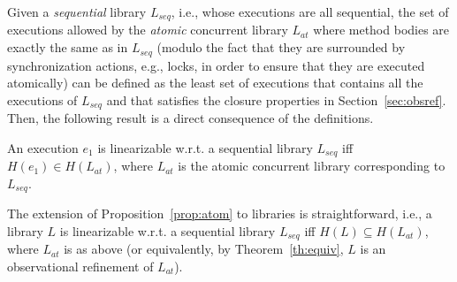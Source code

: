 Given a \emph{sequential} library $L_{seq}$, i.e., whose executions are all sequential, the set of executions allowed by the \emph{atomic} concurrent library $L_{at}$ where method bodies are exactly the same as in $L_{seq}$ (modulo the fact that they are surrounded by synchronization actions, e.g., locks, in order to ensure that they are executed atomically) can be defined as the least set of executions that contains all the executions of $L_{seq}$ and that satisfies the closure properties in Section~\ref{sec:obsref}. Then, the following result is a direct consequence of the definitions.

\begin{proposition}\label{prop:atom}
An execution $e_1$ is linearizable w.r.t. a sequential library $L_{seq}$ iff $H(e_1)\in H(L_{at})$, where $L_{at}$ is the atomic concurrent library corresponding to $L_{seq}$.
\end{proposition}

The extension of Proposition~\ref{prop:atom} to libraries is straightforward, i.e., a library $L$ is linearizable w.r.t. a sequential library $L_{seq}$ iff $H(L)\subseteq H(L_{at})$, where $L_{at}$ is as above (or equivalently, by Theorem~\ref{th:equiv}, $L$ is an observational refinement of $L_{at}$).


